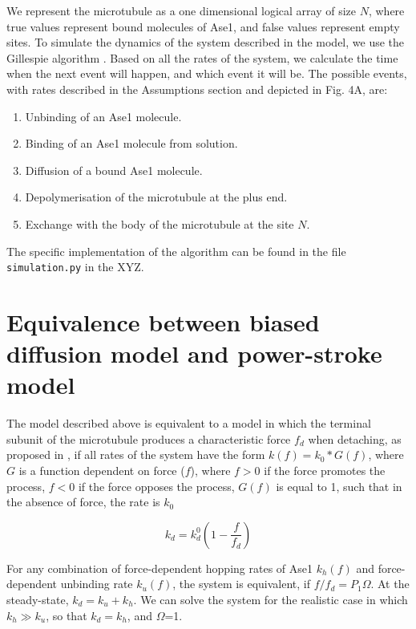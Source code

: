 \documentclass{article}
\begin{document}
We represent the microtubule as a one dimensional logical array of size $N$, where true values represent bound molecules of Ase1, and false values represent empty sites. To simulate the dynamics of the system described in the model, we use the Gillespie algorithm \cite{Gillespie1976}. Based on all the rates of the system, we calculate the time when the next event will happen, and which event it will be. The possible events, with rates described in the Assumptions section and depicted in Fig. 4A, are:
\begin{enumerate}
	\item Unbinding of an Ase1 molecule.
	\item Binding of an Ase1 molecule from solution.
	\item Diffusion of a bound Ase1 molecule.
	\item Depolymerisation of the microtubule at the plus end.
	\item Exchange with the body of the microtubule at the site $N$.
\end{enumerate}
The specific implementation of the algorithm can be found in the file \verb|simulation.py| in the XYZ.

\section{Equivalence between biased diffusion model and power-stroke model}

The model described above is equivalent to a model in which the terminal subunit of the microtubule produces a characteristic force $f_d$ when detaching, as proposed in \cite{Grishchuk2017}, if all rates of the system have the form $k(f) = k_0*G(f)$, where $G$ is a function dependent on force ($f$), where $f>0$ if the force promotes the process, $f<0$ if the force opposes the process, $G(f)$ is equal to 1, such that in the absence of force, the rate is $k_0$

\begin{equation}
k_d = k_d^0\left(1 - \frac{f}{f_d} \right) 
\end{equation}

For any combination of force-dependent hopping rates of Ase1 $k_h(f)$ and force-dependent unbinding rate $k_u(f)$, the system is equivalent, if $f/f_d=P_1\Omega$. At the steady-state, $k_d=k_u+k_h$. We can solve the system for the realistic case in which $k_h\gg k_u$, so that $k_d=k_h$, and $\Omega$=1.

\small


\end{document}
